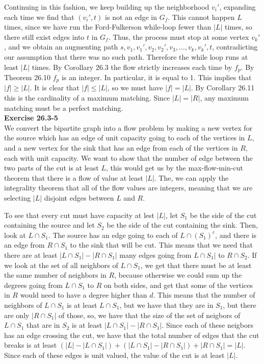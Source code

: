 \documentclass{article}
\begin{document}
Continuing in this fashion, we keep building up the neighborhood $v_i'$, expanding each time we find that $(v_i', t)$ is not an edge in $G_f$.  This cannot happen $L$ times, since we have run the Ford-Fulkerson while-loop fewer than $|L|$ times, so there still exist edges into $t$ in $G_f$. Thus, the process must stop at some vertex $v_k'$, and we obtain an augmenting path $s,v_1,v_1',v_2,v_2',v_3,\ldots, v_k,v_k',t$, contradicting our assumption that there was no such path.  Therefore the while loop runs at least $|L|$ times.  By Corollary 26.3 the flow strictly increases each time by $f_p$.  By Theorem 26.10 $f_p$ is an integer.  In particular, it is equal to 1.  This implies that $|f| \geq |L|$.  It is clear that $|f| \leq |L|$, so we must have $|f| = |L|$.  By Corollary 26.11 this is the cardinality of a maximum matching.  Since $|L| = |R|$, any maximum matching must be a perfect matching. \\

\noindent\textbf{Exercise 26.3-5}\\

We convert the bipartite graph into a flow problem by making a new vertex for the source which has an edge of unit capacity going to each of the vertices in $L$, and a new vertex for the sink that has an edge from each of the vertices in $R$, each with unit capacity. We want to show that the number of edge between the two parts of the cut is at least $L$, this would get us by the max-flow-min-cut theorem that there is a flow of value at least $|L|$. The, we can apply the integrality theorem that all of the flow values are integers, meaning that we are selecting $|L|$ disjoint edges between $L$ and $R$.

To see that every cut must have capacity at lest $|L|$, let $S_1$ be the side of the cut containing the source and let $S_2$ be the side of the cut containing the sink. Then, look at $L\cap S_1$. The source has an edge going to each of $L\cap (S_1)^c$, and there is an edge from $R\cap S_1$ to the sink that will be cut. This means that we need that there are at least $|L\cap S_1| - |R\cap S_1|$ many edges going from $L\cap S_1|$ to $R\cap S_2$. If we look at the set of all neighbors of $L\cap S_1$, we get that there must be at least the same number of neighbors in $R$, because otherwise we could sum up the degrees going from $L\cap S_1$ to $R$ on both sides, and get that some of the vertices in $R$ would need to have a degree higher than $d$. This means that the number of neighbors of $L\cap S_1$ is at least $L\cap S_1$, but we have that they are in $S_1$, but there are only $|R\cap S_1|$ of those, so, we have that the size of the set of neigbors of $L\cap S_1$ that are in $S_2$ is at least $ |L\cap S_1| - |R\cap S_1|$. Since each of these neigbors has an edge crossing the cut, we have that the total number of edges that the cut breaks is at least $(|L| - |L\cap S_1|)  + (|L\cap S_1| - |R\cap S_1|) + |R\cap S_1| = |L|$. Since each of these edges is unit valued, the value of the cut is at least $|L|$.\\
\end{document}
